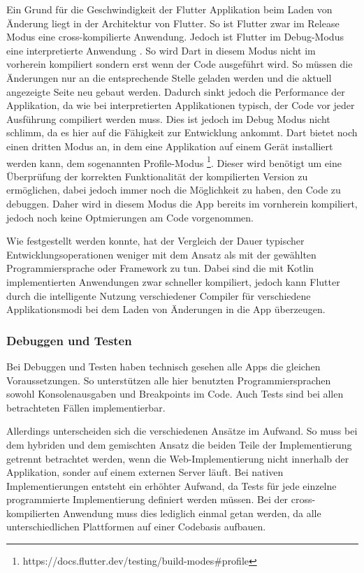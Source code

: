 Ein Grund für die Geschwindigkeit der Flutter Applikation beim Laden von Änderung liegt in der Architektur von Flutter. So ist Flutter zwar im Release Modus eine cross-kompilierte Anwendung. Jedoch ist Flutter im Debug-Modus eine interpretierte Anwendung \cite{flutter_debug_dart}. So wird Dart in diesem Modus nicht im vorherein kompiliert sondern erst wenn der Code ausgeführt wird. So müssen die Änderungen nur an die entsprechende Stelle geladen werden und die aktuell angezeigte Seite neu gebaut werden. Dadurch sinkt jedoch die Performance der Applikation, da wie bei interpretierten Applikationen typisch, der Code vor jeder Ausführung compiliert werden muss. Dies ist jedoch im Debug Modus nicht schlimm, da es hier auf die Fähigkeit zur Entwicklung ankommt. Dart bietet noch einen dritten Modus an, in dem eine Applikation auf einem Gerät installiert werden kann, dem sogenannten Profile-Modus \footnote{https://docs.flutter.dev/testing/build-modes\#profile}\cite{flutter_debug_dart}. 
Dieser wird benötigt um eine Überprüfung der korrekten Funktionalität der kompilierten Version zu ermöglichen, dabei jedoch immer noch die Möglichkeit zu haben, den Code zu debuggen. Daher wird in diesem Modus die App bereits im vornherein kompiliert, jedoch noch keine Optmierungen am Code vorgenommen.

Wie festgestellt werden konnte, hat der Vergleich der Dauer typischer Entwicklungsoperationen weniger mit dem Ansatz als mit der gewählten Programmiersprache oder Framework zu tun. Dabei sind die mit Kotlin implementierten Anwendungen zwar schneller kompiliert, jedoch kann Flutter durch die intelligente Nutzung verschiedener Compiler für verschiedene Applikationsmodi bei dem Laden von Änderungen in die App überzeugen.

\subsubsection{Debuggen und Testen}
Bei Debuggen und Testen haben technisch gesehen alle Apps die gleichen Voraussetzungen. So unterstützen alle hier benutzten Programmiersprachen sowohl Konsolenausgaben und Breakpoints im Code. Auch Tests sind bei allen betrachteten Fällen implementierbar.

Allerdings unterscheiden sich die verschiedenen Ansätze im Aufwand. So muss bei dem hybriden und dem gemischten Ansatz die beiden Teile der Implementierung getrennt betrachtet werden, wenn die Web-Implementierung nicht innerhalb der Applikation, sonder auf einem externen Server läuft. Bei nativen Implementierungen entsteht ein erhöhter Aufwand, da Tests für jede einzelne programmierte Implementierung definiert werden müssen. Bei der cross-kompilierten Anwendung muss dies lediglich einmal getan werden, da alle unterschiedlichen Plattformen auf einer Codebasis aufbauen.

